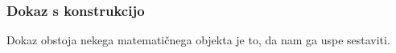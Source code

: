 \documentclass[10pt,a4paper,oneside]{book}
\begin{document}

\pagebreak
{}
\subsubsection{Dokaz s konstrukcijo}
Dokaz obstoja nekega matematičnega objekta je to, da nam ga uspe sestaviti.
\end{document}
